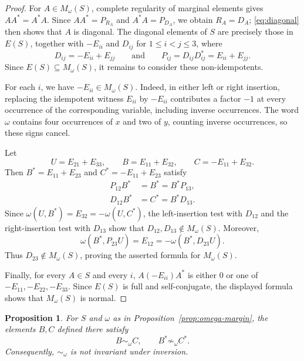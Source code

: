 \documentclass[11pt,a4paper,reqno]{amsart}
\newtheorem{proposition}[theorem]{Proposition}
\numberwithin{equation}{section}
\begin{document}
\begin{proof}
For $A\in M_\omega(S)$, complete regularity of marginal elements \cite[Lemma~4]{AAK} gives $AA^*=A^*A$. Since $AA^*=P_{R_A}$ and $A^*A=P_{D_A}$, we obtain $R_A=D_A$;
\eqref{eq:diagonal} then shows that $A$ is diagonal. The diagonal elements of $S$ are precisely those in $E(S)$, together with $-E_{ii}$ and $D_{ij}$ for $1\le i<j\le3$, where
\[
D_{ij}=-E_{ii}+E_{jj}
\qquad\text{and}\qquad
P_{ij}=D_{ij}D_{ij}^*=E_{ii}+E_{jj}.
\]
Since $E(S)\subseteq M_\omega(S)$, it remains to consider these non-idempotents.

For each $i$, we have $-E_{ii}\in M_\omega(S)$. Indeed, in either left or right insertion, replacing the idempotent witness $E_{ii}$ by $-E_{ii}$ contributes a factor $-1$ at every occurrence of the corresponding variable, including inverse occurrences. The word $\omega$ contains four occurrences of $x$ and two of $y$, counting inverse occurrences, so these signs cancel.

Let
\[
U=E_{21}+E_{33},\qquad
B=E_{11}+E_{32},\qquad
C=-E_{11}+E_{32}.
\]
Then $B^*=E_{11}+E_{23}$ and $C^*=-E_{11}+E_{23}$ satisfy
\[
\begin{aligned}
P_{12}B^*&=B^*=B^*P_{13},\\
D_{12}B^*&=C^*=B^*D_{13}.
\end{aligned}
\]
Since $\omega(U,B^*)=E_{32}=-\omega(U,C^*)$, the left-insertion test with $D_{12}$ and the right-insertion test with $D_{13}$ show that $D_{12},D_{13}\notin M_\omega(S)$. Moreover,
\[
\omega(B^*,P_{23}U)=E_{12}=-\omega(B^*,D_{23}U).
\]
Thus $D_{23}\notin M_\omega(S)$, proving the asserted formula
for $M_\omega(S)$.

Finally, for every $A\in S$ and every $i$, $A(-E_{ii})A^*$ is either $0$ or one of $-E_{11},-E_{22},-E_{33}$. Since $E(S)$ is full and self-conjugate, the displayed formula shows that $M_\omega(S)$ is normal.
\end{proof}


\begin{proposition}\label{prop:omega-inversion}
For $S$ and $\omega$ as in Proposition~\ref{prop:omega-margin}, the elements $B,C$ defined there satisfy
\[
B\sim_\omega C,\qquad B^*\not\sim_\omega C^*.
\]
Consequently, $\sim_\omega$ is not invariant under inversion.
\end{proposition}
\end{document}
